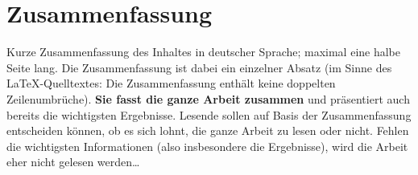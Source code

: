 \section*{Zusammenfassung}
%
%
%

Kurze Zusammenfassung des Inhaltes in deutscher Sprache; maximal eine halbe Seite lang. Die Zusammenfassung ist dabei ein einzelner Absatz (im Sinne des \LaTeX-Quelltextes: Die Zusammenfassung enthält keine doppelten Zeilenumbrüche). \textbf{Sie fasst die ganze Arbeit zusammen} und präsentiert auch bereits die wichtigsten Ergebnisse. Lesende sollen auf Basis der Zusammenfassung entscheiden können, ob es sich lohnt, die ganze Arbeit zu lesen oder nicht. Fehlen die wichtigsten Informationen (also insbesondere die Ergebnisse), wird die Arbeit eher nicht gelesen werden\dots


%
